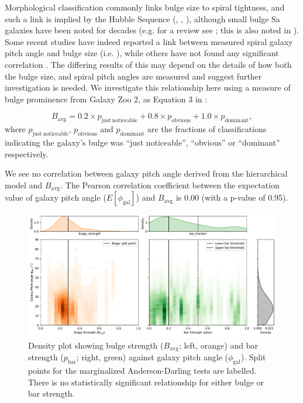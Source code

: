 Morphological classification commonly links bulge size to spiral tightness, and such a link is implied by the Hubble Sequence (\citealt{2005ARA&A..43..581S}, \citealt{2009MNRAS.393.1531G}, \citealt{2013seg..book..155B}), although small bulge Sa galaxies have been noted for decades (e.g. for a review see \citet{2005ARA&A..43..581S}; this is also noted in \citealt{2019MNRAS.487.1808M}). Some recent studies have indeed reported a link between measured spiral galaxy pitch angle and bulge size (i.e. \citealt{2019ApJ...873...85D}), while others have not found any significant correlation \citep{2019MNRAS.487.1808M}. The differing results of this may depend on the details of how both the bulge size, and spiral pitch angles are measured and suggest further investigation is needed. We investigate this relationship here using a measure of bulge prominence from Galaxy Zoo 2, as Equation 3 in \citet{2019MNRAS.487.1808M}:

\begin{equation}
  B_\mathrm{avg} = 0.2\times p_\mathrm{just\ noticeable} + 0.8\times p_\mathrm{obvious} + 1.0\times p_\mathrm{dominant},
\end{equation}
where $p_\mathrm{just\ noticeable}$, $p_\mathrm{obvious}$ and $p_\mathrm{dominant}$ are the fractions of classifications indicating the galaxy's bulge was ``just noticeable'', ``obvious'' or ``dominant'' respectively.

We see no correlation between galaxy pitch angle derived from the hierarchical model and $B_\mathrm{avg}$. The Pearson correlation coefficient between the expectation value of galaxy pitch angle ($E[\phi_\mathrm{gal}]$) and $B_\mathrm{avg}$ is 0.00 (with a p-value of 0.95).

\begin{figure}
  \includegraphics[width=17.7cm]{plots/bulge_bar_phigal_distribution.pdf}
  \caption{Density plot showing bulge strength ($B_\mathrm{avg}$; left, orange) and bar strength ($p_\mathrm{bar}$; right, green) against galaxy pitch angle ($\phi_\mathrm{gal}$). Split points for the marginalized Anderson-Darling tests are labelled. There is no statistically significant relationship for either bulge or bar strength.}
  \label{fig:bulge-bar-pa-hist}
\end{figure}

